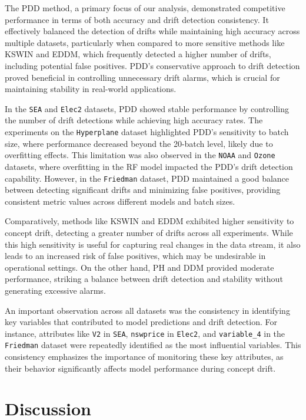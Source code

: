\documentclass[pdflatex,sn-mathphys-ay]{sn-jnl}%
\theoremstyle{thmstyleone}%
\theoremstyle{thmstyletwo}%
\theoremstyle{thmstylethree}%
\begin{document}
The PDD method, a primary focus of our analysis, demonstrated competitive performance in terms of both accuracy and drift detection consistency. It effectively balanced the detection of drifts while maintaining high accuracy across multiple datasets, particularly when compared to more sensitive methods like KSWIN and EDDM, which frequently detected a higher number of drifts, including potential false positives. PDD's conservative approach to drift detection proved beneficial in controlling unnecessary drift alarms, which is crucial for maintaining stability in real-world applications.

In the \texttt{SEA} and \texttt{Elec2} datasets, PDD showed stable performance by controlling the number of drift detections while achieving high accuracy rates. The experiments on the \texttt{Hyperplane} dataset highlighted PDD's sensitivity to batch size, where performance decreased beyond the 20-batch level, likely due to overfitting effects. This limitation was also observed in the \texttt{NOAA} and \texttt{Ozone} datasets, where overfitting in the RF model impacted the PDD's drift detection capability. However, in the \texttt{Friedman} dataset, PDD maintained a good balance between detecting significant drifts and minimizing false positives, providing consistent metric values across different models and batch sizes.

Comparatively, methods like KSWIN and EDDM exhibited higher sensitivity to concept drift, detecting a greater number of drifts across all experiments. While this high sensitivity is useful for capturing real changes in the data stream, it also leads to an increased risk of false positives, which may be undesirable in operational settings. On the other hand, PH and DDM provided moderate performance, striking a balance between drift detection and stability without generating excessive alarms.

An important observation across all datasets was the consistency in identifying key variables that contributed to model predictions and drift detection. For instance, attributes like \texttt{V2} in \texttt{SEA}, \texttt{nswprice} in \texttt{Elec2}, and \texttt{variable\_4} in the \texttt{Friedman} dataset were repeatedly identified as the most influential variables. This consistency emphasizes the importance of monitoring these key attributes, as their behavior significantly affects model performance during concept drift.

\section{Discussion}
\end{document}
